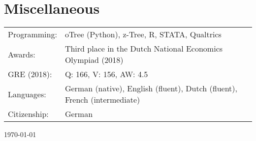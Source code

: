 \documentclass[11pt]{article}
\begin{document}
\section{Miscellaneous}
\noindent\begin{tabular}{L{3cm}L{13cm}}
Programming: & oTree (Python), z-Tree, R, STATA, Qualtrics \\
\rule{0pt}{3ex}Awards: & Third place in the Dutch National Economics Olympiad (2018) \\
\rule{0pt}{3ex}GRE (2018): & Q: 166, V: 156, AW: 4.5 \\
\rule{0pt}{3ex}Languages: & German (native), English (fluent), Dutch (fluent), French (intermediate) \\
\rule{0pt}{3ex}Citizenship: & German
\end{tabular}

\vspace*{1cm}

\hspace*{\fill} \monthyeardate\today
\end{document}
